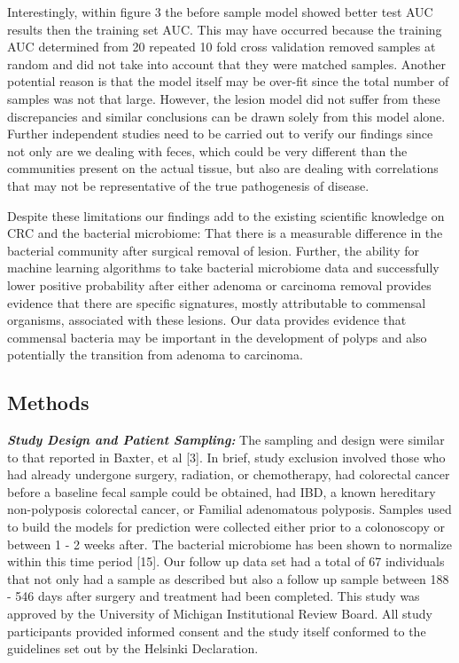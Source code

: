 \documentclass[12pt,]{article}
\begin{document}
Interestingly, within figure 3 the before sample model showed better
test AUC results then the training set AUC. This may have occurred
because the training AUC determined from 20 repeated 10 fold cross
validation removed samples at random and did not take into account that
they were matched samples. Another potential reason is that the model
itself may be over-fit since the total number of samples was not that
large. However, the lesion model did not suffer from these discrepancies
and similar conclusions can be drawn solely from this model alone.
Further independent studies need to be carried out to verify our
findings since not only are we dealing with feces, which could be very
different than the communities present on the actual tissue, but also
are dealing with correlations that may not be representative of the true
pathogenesis of disease.

Despite these limitations our findings add to the existing scientific
knowledge on CRC and the bacterial microbiome: That there is a
measurable difference in the bacterial community after surgical removal
of lesion. Further, the ability for machine learning algorithms to take
bacterial microbiome data and successfully lower positive probability
after either adenoma or carcinoma removal provides evidence that there
are specific signatures, mostly attributable to commensal organisms,
associated with these lesions. Our data provides evidence that commensal
bacteria may be important in the development of polyps and also
potentially the transition from adenoma to carcinoma.

\newpage

\subsection{Methods}\label{methods}

\textbf{\emph{Study Design and Patient Sampling:}} The sampling and
design were similar to that reported in Baxter, et al {[}3{]}. In brief,
study exclusion involved those who had already undergone surgery,
radiation, or chemotherapy, had colorectal cancer before a baseline
fecal sample could be obtained, had IBD, a known hereditary
non-polyposis colorectal cancer, or Familial adenomatous polyposis.
Samples used to build the models for prediction were collected either
prior to a colonoscopy or between 1 - 2 weeks after. The bacterial
microbiome has been shown to normalize within this time period {[}15{]}.
Our follow up data set had a total of 67 individuals that not only had a
sample as described but also a follow up sample between 188 - 546 days
after surgery and treatment had been completed. This study was approved
by the University of Michigan Institutional Review Board. All study
participants provided informed consent and the study itself conformed to
the guidelines set out by the Helsinki Declaration.
\end{document}
